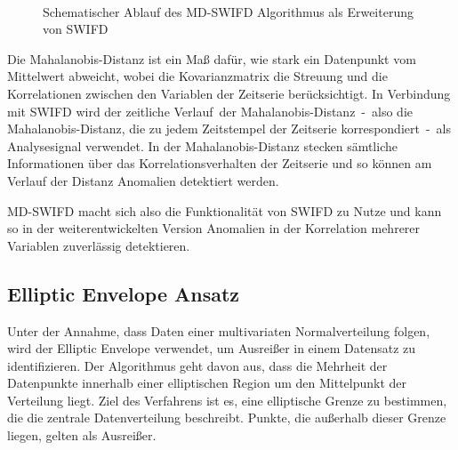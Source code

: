 \begin{figure}[t!]
    \caption{Schematischer Ablauf des MD-SWIFD Algorithmus als Erweiterung von SWIFD}
~\label{fig:md_swifd_schema}
\end{figure}

Die Mahalanobis-Distanz ist ein Maß dafür, wie stark ein Datenpunkt vom Mittelwert abweicht, wobei die Kovarianzmatrix die Streuung und die Korrelationen
zwischen den Variablen der Zeitserie berücksichtigt. In Verbindung mit SWIFD wird der \glqq zeitliche Verlauf\grqq~der Mahalanobis-Distanz~-~also die
Mahalanobis-Distanz, die zu jedem Zeitstempel der Zeitserie korrespondiert~-~als Analysesignal verwendet. In der Mahalanobis-Distanz stecken sämtliche
Informationen über das Korrelationsverhalten der Zeitserie und so können am Verlauf der Distanz Anomalien detektiert werden.

MD-SWIFD macht sich also die Funktionalität von SWIFD zu Nutze und kann so in der weiterentwickelten Version Anomalien in der Korrelation mehrerer Variablen
zuverlässig detektieren.

\subsection{Elliptic Envelope Ansatz}
Unter der Annahme, dass Daten einer multivariaten Normalverteilung folgen, wird der Elliptic Envelope verwendet, um Ausreißer in einem Datensatz zu
identifizieren. Der Algorithmus geht davon aus, dass die Mehrheit der Datenpunkte innerhalb einer elliptischen Region um den Mittelpunkt der Verteilung
liegt. Ziel des Verfahrens ist es, eine elliptische Grenze zu bestimmen, die die zentrale Datenverteilung beschreibt. Punkte, die außerhalb dieser Grenze
liegen, gelten als Ausreißer.


